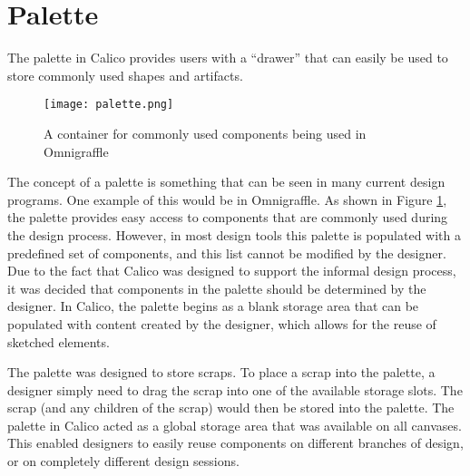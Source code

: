 \section{Palette}
The palette in Calico provides users with a ``drawer'' that can easily be used to store commonly used shapes and artifacts.
\begin{figure}[htb]
  \centering
  \texttt{[image: palette.png]}
  \caption{A container for commonly used components being used in Omnigraffle}
  \label{fig:palette_omnigraffle}
\end{figure}
The concept of a palette is something that can be seen in many current design programs. One example of this would be in Omnigraffle\cite{omnigraffle}. As shown in Figure \ref{fig:palette_omnigraffle}, the palette provides easy access to components that are commonly used during the design process. However, in most design tools this palette is populated with a predefined set of components, and this list cannot be modified by the designer. Due to the fact that Calico was designed to support the informal design process, it was decided that components in the palette should be determined by the designer. In Calico, the palette begins as a blank storage area that can be populated with content created by the designer, which allows for the reuse of sketched elements. 

The palette was designed to store scraps. To place a scrap into the palette, a designer simply need to drag the scrap into one of the available storage slots. The scrap (and any children of the scrap) would then be stored into the palette. The palette in Calico acted as a global storage area that was available on all canvases. This enabled designers to easily reuse components on different branches of design, or on completely different design sessions.  





